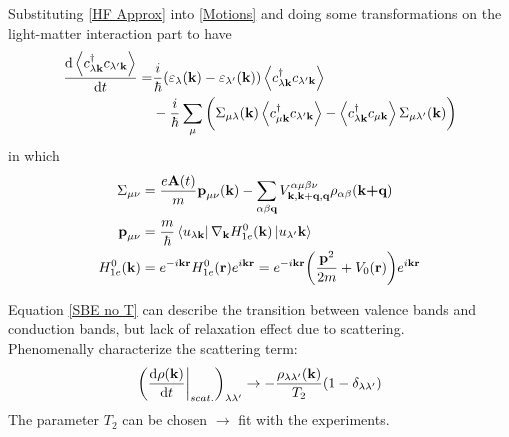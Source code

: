 \documentclass{beamer}
\begin{document}
\begin{frame}
	Substituting \eqref{HF Approx} into \eqref{Motions} and doing some transformations on the light-matter interaction part to have
\begin{align}
\label{SBE no T}
\dv{\ev{c^{\dagger}_{\lambda\textbf{k}} c_{\lambda'\textbf{k}}}}{t} = &\frac{i}{\hbar} (\varepsilon_{\lambda}(\textbf{k}) - \varepsilon_{\lambda'}(\textbf{k}))\ev{c^{\dagger}_{\lambda\textbf{k}} c_{\lambda'\textbf{k}}}\nonumber\\
&-\frac{i}{\hbar} \sum_{\mu}\bigg(\Sigma_{\mu \lambda}(\textbf{k}) \ev{c^{\dagger}_{\mu\textbf{k}} c_{\lambda'\textbf{k}}} - \ev{c^{\dagger}_{\lambda\textbf{k}} c_{\mu\textbf{k}}} \Sigma_{\mu \lambda'}(\textbf{k})\bigg)
\end{align}
in which
\begin{align}
	\Sigma_{\mu\nu} &= \frac{e\textbf{A}(t)}{m}\textbf{p}_{\mu\nu}(\textbf{k}) - \sum_{\alpha\beta\textbf{q}} V^{\alpha \mu \beta \nu}_{\textbf{k},\textbf{k}+\textbf{q},\textbf{q}}\rho_{\alpha \beta}(\textbf{k+q})\\
	\textbf{p}_{\mu \nu} &= \frac{m}{\hbar}\bra{u_{\lambda \textbf{k}}}\nabla_{\textbf{k}}H^0_{1e}(\textbf{k})\ket{u_{\lambda'}\textbf{k}}\\
	H^0_{1e}(\textbf{k}) &= e^{-i\textbf{k}\textbf{r}} H^0_{1e}(\textbf{r})e^{i\textbf{k}\textbf{r}} = e^{-i\textbf{k}\textbf{r}} \bigg(\frac{\textbf{p}^2}{2m} +V_0(\textbf{r})\bigg)e^{i\textbf{k}\textbf{r}}
\end{align}
\end{frame}
\begin{frame}
\quad Equation \eqref{SBE no T} can describe the transition between valence bands and conduction bands, but lack of relaxation effect due to scattering.\\\null
\quad Phenomenally characterize the scattering term:
\begin{equation}
	\bigg(\dv{\rho(\textbf{k})}{t}\bigg|_{scat.}\bigg)_{\lambda\lambda'} \to - \frac{\rho_{\lambda\lambda'}(\textbf{k})}{T_2}(1-\delta_{\lambda\lambda'})
\end{equation}
\quad The parameter \(T_2\) can be chosen $\to$ fit with the experiments.
\end{frame}
\end{document}
